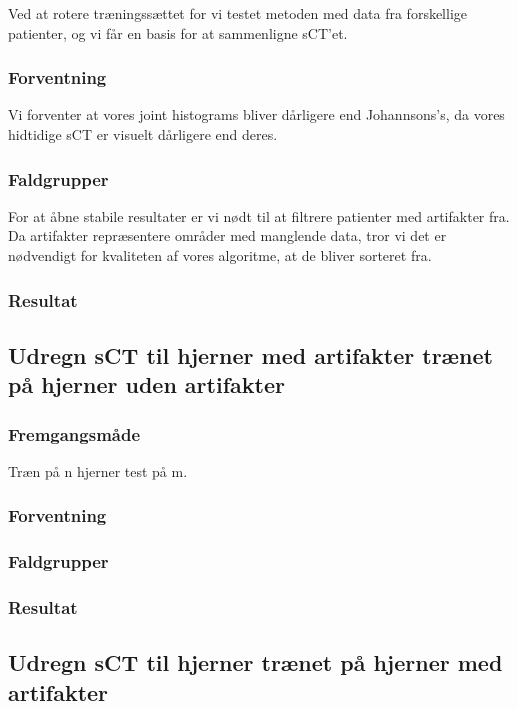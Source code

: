 Ved at rotere træningssættet for vi testet metoden med data fra forskellige patienter, og vi får en basis for at sammenligne sCT'et.


\subsubsection{Forventning}
Vi forventer at vores joint histograms bliver dårligere end Johannsons's, da vores hidtidige sCT er visuelt dårligere end deres.


\subsubsection{Faldgrupper}
For at åbne stabile resultater er vi nødt til at filtrere patienter med artifakter fra. Da artifakter repræsentere områder med manglende data, tror vi det er nødvendigt for kvaliteten af vores algoritme, at de bliver sorteret fra.

\subsubsection{Resultat}

\subsection{Udregn sCT til hjerner med artifakter trænet på hjerner uden artifakter}
\subsubsection{Fremgangsmåde}
Træn på n hjerner test på m.

\subsubsection{Forventning}

\subsubsection{Faldgrupper}

\subsubsection{Resultat}

\subsection{Udregn sCT til hjerner trænet på hjerner med artifakter}
